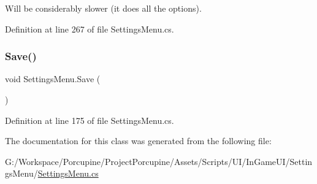 Will be considerably slower (it does all the options). 



Definition at line 267 of file Settings\+Menu.\+cs.

\mbox{\label{class_settings_menu_a0c16f016731747c6cdbfe6f45cdfa8e9}} 
\subsubsection{\texorpdfstring{Save()}{Save()}}
{\footnotesize\ttfamily void Settings\+Menu.\+Save (\begin{DoxyParamCaption}{ }\end{DoxyParamCaption})}



Definition at line 175 of file Settings\+Menu.\+cs.



The documentation for this class was generated from the following file\+:\begin{DoxyCompactItemize}
\item 
G\+:/\+Workspace/\+Porcupine/\+Project\+Porcupine/\+Assets/\+Scripts/\+U\+I/\+In\+Game\+U\+I/\+Settings\+Menu/\hyperlink{_settings_menu_8cs}{Settings\+Menu.\+cs}\end{DoxyCompactItemize}
